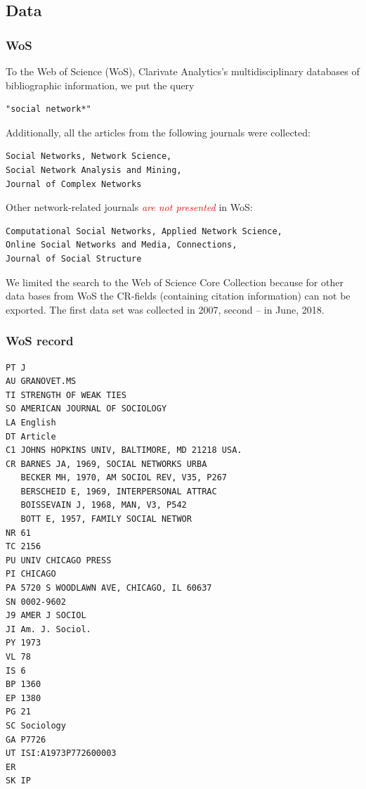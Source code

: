 \documentclass[hyperref={pdfstartview={FitBH -32768},
                         pdfpagemode=FullScreen,
                         plainpages=false,
                         colorlinks=true}
              ]{beamer}
\newcommand{\keyw}[1]{\textcolor{red}{\emph{#1}}}
\begin{document}
\subsection{Data}

\begin{frame}[fragile]
\frametitle{WoS}
\small

To the Web of Science (WoS), Clarivate Analytics’s multidisciplinary databases of bibliographic
information, we put the query
\begin{verbatim} 
"social network*"
\end{verbatim}
Additionally, all the articles from the following journals were collected:
\begin{verbatim}
Social Networks, Network Science, 
Social Network Analysis and Mining, 
Journal of Complex Networks
\end{verbatim}

Other network-related journals \keyw{are not presented} in WoS: 
\begin{verbatim}
Computational Social Networks, Applied Network Science, 
Online Social Networks and Media, Connections, 
Journal of Social Structure
\end{verbatim}

We limited the search to the Web of Science Core Collection because for other data bases from WoS the CR-fields (containing citation information) can not be exported. The first data set was collected in 2007, second -- in June, 2018. 

\end{frame}

\begin{frame}[fragile]
\frametitle{WoS record}
\renewcommand{\baselinestretch}{0.8}
\tiny
\begin{verbatim}
PT J
AU GRANOVET.MS
TI STRENGTH OF WEAK TIES
SO AMERICAN JOURNAL OF SOCIOLOGY
LA English
DT Article
C1 JOHNS HOPKINS UNIV, BALTIMORE, MD 21218 USA.
CR BARNES JA, 1969, SOCIAL NETWORKS URBA
   BECKER MH, 1970, AM SOCIOL REV, V35, P267
   BERSCHEID E, 1969, INTERPERSONAL ATTRAC
   BOISSEVAIN J, 1968, MAN, V3, P542
   BOTT E, 1957, FAMILY SOCIAL NETWOR
NR 61
TC 2156
PU UNIV CHICAGO PRESS
PI CHICAGO
PA 5720 S WOODLAWN AVE, CHICAGO, IL 60637
SN 0002-9602
J9 AMER J SOCIOL
JI Am. J. Sociol.
PY 1973
VL 78
IS 6
BP 1360
EP 1380
PG 21
SC Sociology
GA P7726
UT ISI:A1973P772600003
ER
SK IP
\end{verbatim}
\end{frame}
\end{document}
